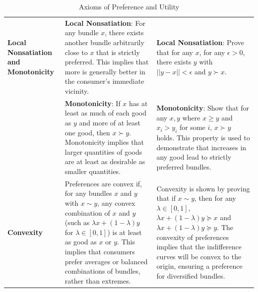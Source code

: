 \documentclass{article}
\begin{document}
\begin{table}[H]
\begin{tabular}{|>{\centering\arraybackslash}m{2.5cm}|>{\arraybackslash}m{7cm}|>{\arraybackslash}m{7cm}|}
        \textbf{Local Nonsatiation and Monotonicity} & \textbf{Local Nonsatiation}: For any bundle \( x \), there exists another bundle arbitrarily close to \( x \) that is strictly preferred. This implies that more is generally better in the consumer’s immediate vicinity. & \textbf{Local Nonsatiation}: Prove that for any \( x \), for any \( \epsilon > 0 \), there exists \( y \) with \( ||y - x|| < \epsilon \) and \( y \succ x \). \\ 
        & \textbf{Monotonicity}: If \( x \) has at least as much of each good as \( y \) and more of at least one good, then \( x \succ y \). Monotonicity implies that larger quantities of goods are at least as desirable as smaller quantities.
        & \textbf{Monotonicity}: Show that for any \( x, y \) where \( x \geq y \) and \( x_i > y_i \) for some \( i \), \( x \succ y \) holds. This property is used to demonstrate that increases in any good lead to strictly preferred bundles. \\ \hline
        \textbf{Convexity} & Preferences are convex if, for any bundles \( x \) and \( y \) with \( x \sim y \), any convex combination of \( x \) and \( y \) (such as \( \lambda x + (1 - \lambda)y \) for \( \lambda \in [0,1] \)) is at least as good as \( x \) or \( y \). This implies that consumers prefer averages or balanced combinations of bundles, rather than extremes. & Convexity is shown by proving that if \( x \sim y \), then for any \( \lambda \in [0, 1] \), \( \lambda x + (1 - \lambda)y \succeq x \) and \( \lambda x + (1 - \lambda)y \succeq y \). The convexity of preferences implies that the indifference curves will be convex to the origin, ensuring a preference for diversified bundles. \\ \hline
    \end{tabular}
    \caption{Axioms of Preference and Utility}
    \label{tab:axioms_table}
\end{table}
\end{document}
